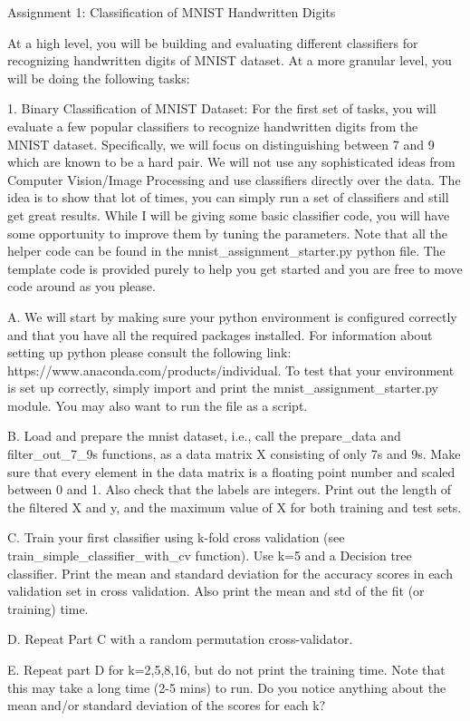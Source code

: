 Assignment 1: Classification of MNIST Handwritten Digits

At a high level, you will be building and evaluating different classifiers for recognizing handwritten digits of MNIST dataset. At a more granular level, you will be doing the following tasks:

1. Binary Classification of MNIST Dataset: For the first set of tasks, you will evaluate a few popular classifiers to recognize handwritten digits from the MNIST dataset. Specifically, we will focus on distinguishing between 7 and 9 which are known to be a hard pair. We will not use any sophisticated ideas from Computer Vision/Image Processing and use classifiers directly over the data. The idea is to show that lot of times, you can simply run a set of classifiers and still get great results. While I will be giving some basic classifier code, you will have some opportunity to improve them by tuning the parameters. Note that all the helper code can be found in the mnist_assignment_starter.py python file. The template code is provided purely to help you get started and you are free to move code around as you please.

A. We will start by making sure your python environment is configured correctly and that you have all the required packages installed. For information about setting up python please consult the following link: https://www.anaconda.com/products/individual. To test that your environment is set up correctly, simply import and print the mnist_assignment_starter.py module. You may also want to run the file as a script.

B. Load and prepare the mnist dataset, i.e., call the prepare_data and filter_out_7_9s functions, as a data matrix X consisting of only 7s and 9s. Make sure that every element in the data matrix is a floating point number and scaled between 0 and 1. Also check that the labels are integers. Print out the length of the filtered X and y, and the maximum value of X for both training and test sets.

C. Train your first classifier using k-fold cross validation (see train_simple_classifier_with_cv function). Use k=5 and a Decision tree classifier. Print the mean and standard deviation for the accuracy scores in each validation set in cross validation. Also print the mean and std of the fit (or training) time.

D. Repeat Part C with a random permutation cross-validator.

E. Repeat part D for k=2,5,8,16, but do not print the training time. Note that this may take a long time (2-5 mins) to run. Do you notice anything about the mean and/or standard deviation of the scores for each k?


